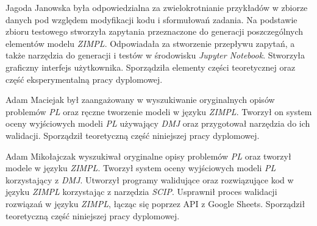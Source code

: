 Jagoda Janowska była odpowiedzialna za zwielokrotnianie przykładów w zbiorze danych pod względem modyfikacji kodu i sformułowań zadania. Na podstawie zbioru testowego stworzyła zapytania przeznaczone do generacji poszczególnych elementów modelu \textit{ZIMPL}. Odpowiadała za stworzenie przepływu zapytań, a także narzędzia do generacji i testów w środowisku \textit{Jupyter Notebook}. Stworzyła graficzny interfejs użytkownika. Sporządziła elementy części teoretycznej oraz część eksperymentalną pracy dyplomowej.

Adam Maciejak był zaangażowany w wyszukiwanie oryginalnych opisów problemów \textit{PL} oraz ręczne tworzenie modeli w języku \textit{ZIMPL}. Tworzył on system oceny wyjściowych modeli \textit{PL} używający \textit{DMJ} oraz przygotował narzędzia do ich walidacji. Sporządził teoretyczną część niniejszej pracy dyplomowej.

Adam Mikołajczak wyszukiwał oryginalne opisy problemów \textit{PL} oraz tworzył modele w języku \textit{ZIMPL}. Tworzył system oceny wyjściowych modeli \textit{PL} korzystający z \textit{DMJ}. Utworzył programy walidujące oraz rozwiązujące kod w języku \textit{ZIMPL} korzystając z narzędzia \textit{SCIP}. Usprawnił proces walidacji rozwiązań w języku \textit{ZIMPL}, łącząc się poprzez API z Google Sheets. Sporządził teoretyczną część niniejszej pracy dyplomowej. 
